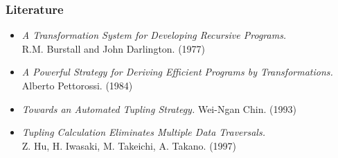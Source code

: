 \documentclass{beamer}
\begin{document}
\begin{frame}[fragile]
  \frametitle{Literature}
\begin{itemize}
  \item \textit{A Transformation System for Developing Recursive Programs.} \\ R.M. Burstall and John Darlington. (1977)
  \item \textit{A Powerful Strategy for Deriving Efficient Programs by Transformations.} Alberto Pettorossi. (1984)
  \item \textit{Towards an Automated Tupling Strategy.} Wei-Ngan Chin. (1993)
  \item \textit{Tupling Calculation Eliminates Multiple Data Traversals.} \\Z. Hu, H. Iwasaki, M. Takeichi, A. Takano. (1997)
\end{itemize}
\end{frame}
\end{document}
